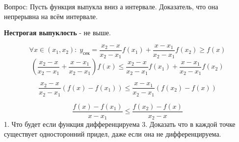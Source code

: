\documentclass[12pt, a4paper]{article}
\begin{document}

Вопрос: Пусть функция выпукла вниз а интервале. Доказатель, что она непрерывна на всём интервале. 

\textbf{Нестрогая выпуклость} - не выше. 


\[ \forall x \in (x_1, x_2):\; y_{\text{сек}} = \boxed{\frac{x_2 - x}{x_2 - x_1}f(x_1) + \frac{x - x_1}{x_2 - x_1}f(x_2) \geq f(x) }\]
\[
\left( \frac{x_2 - x}{x_2 - x_1} + \frac{x - x_1}{x_2 - x_1} \right) f(x) \leq \frac{x_2 - x}{x_2 - x_1} f(x_1) + \frac{x - x_1}{x_2 - x_1} f(x_2)
\]

\[
\frac{x_2 - x}{x_2 - x_1} \left( f(x) - f(x_1) \right) \leq \frac{x - x_1}{x_2 - x_1} \left( f(x_2) - f(x) \right)
\]

\[
\boxed{ \frac{f(x) - f(x_1)}{x - x_1} \leq \frac{f(x_2) - f(x)}{x_2 - x} }
\]
1. Что будет если функция дифференцируема
3. Доказать что в каждой точке существует односторонний придел, даже если она не дифференцируема. 
\end{document}
